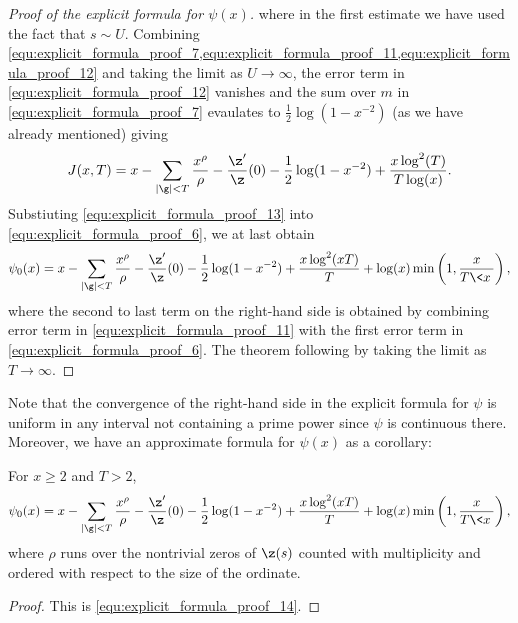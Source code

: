 \begin{proof}[Proof of the explicit formula for $\psi(x)$]
        where in the first estimate we have used the fact that $s \sim U$. Combining \cref{equ:explicit_formula_proof_7,equ:explicit_formula_proof_11,equ:explicit_formula_proof_12} and taking the limit as $U \to \infty$, the error term in \cref{equ:explicit_formula_proof_12} vanishes and the sum over $m$ in \cref{equ:explicit_formula_proof_7} evaulates to $\frac{1}{2}\log(1-x^{-2})$ (as we have already mentioned) giving
        \begin{equation}\label{equ:explicit_formula_proof_13}
          J(x,T) = x-\sum_{|\g| < T}\frac{x^{\rho}}{\rho}-\frac{\z'}{\z}(0)-\frac{1}{2}\log(1-x^{-2})+\frac{x\log^{2}(T)}{T\log(x)}.
        \end{equation}
        Substiuting \cref{equ:explicit_formula_proof_13} into \cref{equ:explicit_formula_proof_6}, we at last obtain
        \begin{equation}\label{equ:explicit_formula_proof_14}
          \psi_{0}(x) = x-\sum_{|\g| < T}\frac{x^{\rho}}{\rho}-\frac{\z'}{\z}(0)-\frac{1}{2}\log(1-x^{-2})+\frac{x\log^{2}(xT)}{T}+\log(x)\min\left(1,\frac{x}{T\<x\>}\right),
        \end{equation}
        where the second to last term on the right-hand side is obtained by combining error term in \cref{equ:explicit_formula_proof_11} with the first error term in \cref{equ:explicit_formula_proof_6}. The theorem following by taking the limit as $T \to \infty$.
      \end{proof}

      Note that the convergence of the right-hand side in the explicit formula for $\psi$ is uniform in any interval not containing a prime power since $\psi$ is continuous there. Moreover, we have an approximate formula for $\psi(x)$ as a corollary:

      \begin{corollary}\label{cor:explicit_formula_zeta_corollary}
         For $x \ge 2$ and $T > 2$,
        \[
           \psi_{0}(x) = x-\sum_{|\g| < T}\frac{x^{\rho}}{\rho}-\frac{\z'}{\z}(0)-\frac{1}{2}\log(1-x^{-2})+\frac{x\log^{2}(xT)}{T}+\log(x)\min\left(1,\frac{x}{T\<x\>}\right),
        \]
        where $\rho$ runs over the nontrivial zeros of $\z(s)$ counted with multiplicity and ordered with respect to the size of the ordinate.
      \end{corollary}
      \begin{proof}
        This is \cref{equ:explicit_formula_proof_14}.
      \end{proof}
